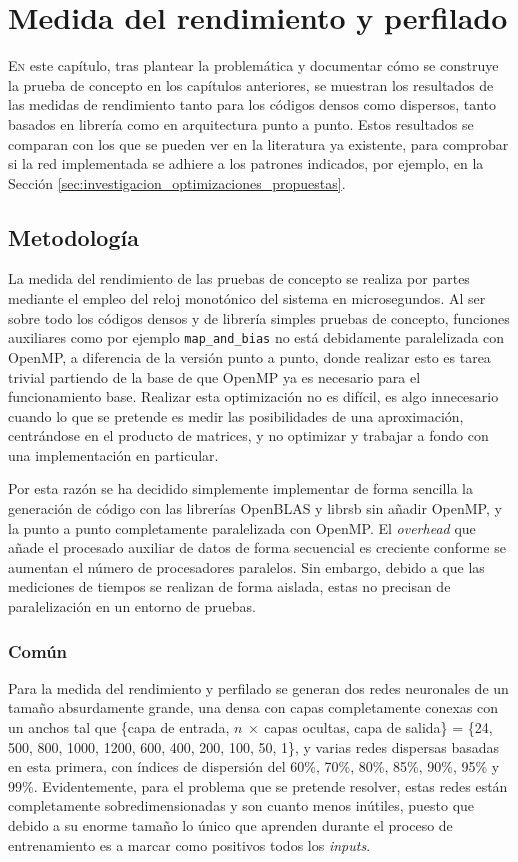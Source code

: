 \chapter{Medida del rendimiento y perfilado}
\label{chap:medida_rendimiento_perfilado}

\lettrine{E}{n} este capítulo, tras plantear la problemática y documentar cómo se construye la prueba de concepto en los capítulos anteriores, se muestran los resultados de las medidas de rendimiento tanto para los códigos densos como dispersos, tanto basados en librería como en arquitectura punto a punto. Estos resultados se comparan con los que se pueden ver en la literatura ya existente, para comprobar si la red implementada se adhiere a los patrones indicados, por ejemplo, en la Sección \ref{sec:investigacion_optimizaciones_propuestas}.

\section{Metodología}
\label{sec:metodologia}
La medida del rendimiento de las pruebas de concepto se realiza por partes mediante el empleo del reloj monotónico del sistema en microsegundos. Al ser sobre todo los códigos densos y de librería simples pruebas de concepto, funciones auxiliares como por ejemplo \texttt{map\_and\_bias} no está debidamente paralelizada con OpenMP, a diferencia de la versión punto a punto, donde realizar esto es tarea trivial partiendo de la base de que OpenMP ya es necesario para el funcionamiento base. Realizar esta optimización no es difícil, es algo innecesario cuando lo que se pretende es medir las posibilidades de una aproximación, centrándose en el producto de matrices, y no optimizar y trabajar a fondo con una implementación en particular.

Por esta razón se ha decidido simplemente implementar de forma sencilla la generación de código con las librerías OpenBLAS y librsb sin añadir OpenMP, y la punto a punto completamente paralelizada con OpenMP. El \textit{overhead} que añade el procesado auxiliar de datos de forma secuencial es creciente conforme se aumentan el número de procesadores paralelos. Sin embargo, debido a que las mediciones de tiempos se realizan de forma aislada, estas no precisan de paralelización en un entorno de pruebas.

\subsection{Común}
\label{ssec:comun_metodologia}
Para la medida del rendimiento y perfilado se generan dos redes neuronales de un tamaño absurdamente grande, una densa con capas completamente conexas con un anchos tal que \{capa de entrada, $n\:\times\:$capas ocultas, capa de salida\} = \{24, 500, 800, 1000, 1200, 600, 400, 200, 100, 50, 1\}, y varias redes dispersas basadas en esta primera, con índices de dispersión del 60\%, 70\%, 80\%, 85\%, 90\%, 95\% y 99\%. Evidentemente, para el problema que se pretende resolver, estas redes están completamente sobredimensionadas y son cuanto menos inútiles, puesto que debido a su enorme tamaño lo único que aprenden durante el proceso de entrenamiento es a marcar como positivos todos los \textit{inputs}.

